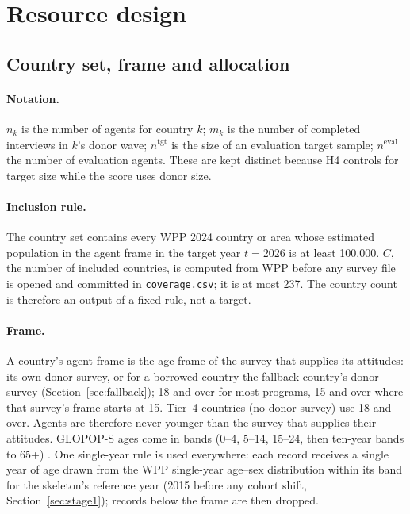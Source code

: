 \documentclass[10pt]{article}
\begin{document}
\section{Resource design}
\label{sec:design}

\subsection{Country set, frame and allocation}
\label{sec:alloc}

\paragraph{Notation.} $n_k$ is the number of agents for country $k$; $m_k$ is the number of completed interviews in $k$'s donor wave; $n^{\text{tgt}}$ is the size of an evaluation target sample; $n^{\text{eval}}$ the number of evaluation agents. These are kept distinct because H4 controls for target size while the score uses donor size.

\paragraph{Inclusion rule.} The country set contains every WPP 2024 country or area \citep{wpp2024} whose estimated population in the agent frame in the target year $t = 2026$ is at least 100,000. $C$, the number of included countries, is computed from WPP before any survey file is opened and committed in \nolinkurl{coverage.csv}; it is at most 237. The country count is therefore an output of a fixed rule, not a target.

\paragraph{Frame.} A country's agent frame is the age frame of the survey that supplies its attitudes: its own donor survey, or for a borrowed country the fallback country's donor survey (Section~\ref{sec:fallback}); 18 and over for most programs, 15 and over where that survey's frame starts at 15. Tier~4 countries (no donor survey) use 18 and over. Agents are therefore never younger than the survey that supplies their attitudes. GLOPOP-S ages come in bands (0--4, 5--14, 15--24, then ten-year bands to 65+) \citep{ton2024glopop}. One single-year rule is used everywhere: each record receives a single year of age drawn from the WPP single-year age--sex distribution within its band for the skeleton's reference year (2015 before any cohort shift, Section~\ref{sec:stage1}); records below the frame are then dropped.
\end{document}
